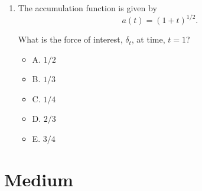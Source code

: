 \documentclass[11pt]{article}
\begin{document}
\begin{enumerate}[label=\textbf{\arabic*.}]
\medskip
\hrule
\medskip

\item The accumulation function is given by
\[
a(t)=(1+t)^{1/2}.
\]

What is the force of interest, $\delta_t$, at time, $t=1$?

\begin{itemize}
\item A. $1/2$
\item B. $1/3$
\item C. $1/4$
\item D. $2/3$
\item E. $3/4$
\end{itemize}

\end{enumerate}

\section*{Medium}
\end{document}
